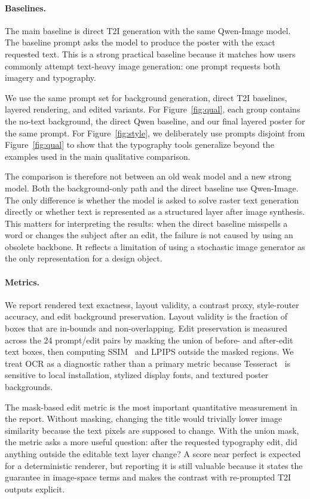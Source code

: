 \documentclass[10pt,twocolumn,letterpaper]{article}
\begin{document}
\paragraph{Baselines.}
The main baseline is direct T2I generation with the same Qwen-Image model. The baseline prompt asks the model to produce the poster with the exact requested text. This is a strong practical baseline because it matches how users commonly attempt text-heavy image generation: one prompt requests both imagery and typography.

We use the same prompt set for background generation, direct T2I baselines, layered rendering, and edited variants. For Figure~\ref{fig:qual}, each group contains the no-text background, the direct Qwen baseline, and our final layered poster for the same prompt. For Figure~\ref{fig:style}, we deliberately use prompts disjoint from Figure~\ref{fig:qual} to show that the typography tools generalize beyond the examples used in the main qualitative comparison.

The comparison is therefore not between an old weak model and a new strong model. Both the background-only path and the direct baseline use Qwen-Image. The only difference is whether the model is asked to solve raster text generation directly or whether text is represented as a structured layer after image synthesis. This matters for interpreting the results: when the direct baseline misspells a word or changes the subject after an edit, the failure is not caused by using an obsolete backbone. It reflects a limitation of using a stochastic image generator as the only representation for a design object.

\paragraph{Metrics.}
We report rendered text exactness, layout validity, a contrast proxy, style-router accuracy, and edit background preservation. Layout validity is the fraction of boxes that are in-bounds and non-overlapping. Edit preservation is measured across the 24 prompt/edit pairs by masking the union of before- and after-edit text boxes, then computing SSIM~\cite{wang2004ssim} and LPIPS outside the masked regions. We treat OCR as a diagnostic rather than a primary metric because Tesseract~\cite{smith2007tesseract} is sensitive to local installation, stylized display fonts, and textured poster backgrounds.

The mask-based edit metric is the most important quantitative measurement in the report. Without masking, changing the title would trivially lower image similarity because the text pixels are supposed to change. With the union mask, the metric asks a more useful question: after the requested typography edit, did anything outside the editable text layer change? A score near perfect is expected for a deterministic renderer, but reporting it is still valuable because it states the guarantee in image-space terms and makes the contrast with re-prompted T2I outputs explicit.
\end{document}
